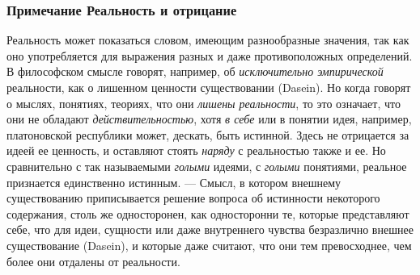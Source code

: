 \subsubsection[Примечание Реальность и отрицание]
{Примечание Реальность и отрицание}
\label{bkm:bm73a}
Реальность может показаться словом, имеющим разнообразные значения, так как
оно употребляется для выражения разных и даже противоположных определений.
В философском смысле говорят, например, об
{\em исключительно эмпирической} реальности, как о
лишенном ценности существовании (Dasein). Но когда говорят о мыслях,
понятиях, теориях, что они {\em лишены реальности}, то
это означает, что они не обладают
{\em действительностью}, хотя
{\em в себе} или в понятии идея, например, платоновской
республики может, дескать, быть истинной. Здесь не отрицается за идеей ее
ценность, и оставляют стоять {\em наряду} с реальностью
также и ее. Но сравнительно с так называемыми
{\em голыми} идеями, с {\em голыми}
понятиями, реальное признается единственно истинным. — Смысл, в котором
внешнему существованию приписывается решение вопроса об истинности
некоторого содержания, столь же односторонен, как односторонни те, которые
представляют себе, что для идеи, сущности или даже внутреннего чувства
безразлично внешнее существование (Dasein), и которые даже считают, что они
тем превосходнее, чем более они отдалены от реальности.

